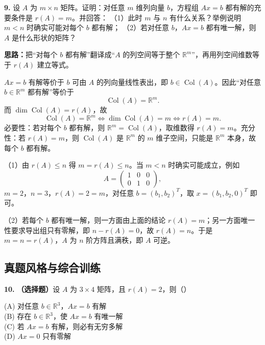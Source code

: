 \else \answerarea[10] \fi%

\textbf{9.} 设 $A$ 为 $m\times n$ 矩阵。证明：对任意 $m$ 维列向量 $b$，方程组 $Ax=b$ 都有解的充要条件是 $r(A)=m$。并回答：
（1）此时 $m$ 与 $n$ 有什么关系？举例说明 $m<n$ 时确实可能对每个 $b$ 都有解；
（2）若对任意 $b$，$Ax=b$ 都有唯一解，则 $A$ 是什么形状的矩阵？

\ifshowsolutions%

\textbf{思路：}把“对每个 $b$ 都有解”翻译成“$A$ 的列空间等于整个 $\mathbb R^m$”，再用列空间维数等于 $r(A)$ 建立等式。

$Ax=b$ 有解等价于 $b$ 可由 $A$ 的列向量线性表出，即 $b\in\operatorname{Col}(A)$。因此“对任意 $b\in\mathbb R^m$ 都有解”等价于
\[
\operatorname{Col}(A)=\mathbb R^m.
\]
而 $\dim\operatorname{Col}(A)=r(A)$，故
\[
\operatorname{Col}(A)=\mathbb R^m
\iff \dim\operatorname{Col}(A)=m
\iff r(A)=m.
\]
必要性：若对每个 $b$ 都有解，则 $\mathbb R^m=\operatorname{Col}(A)$，取维数得 $r(A)=m$。充分性：若 $r(A)=m$，则 $\operatorname{Col}(A)$ 是 $\mathbb R^m$ 的 $m$ 维子空间，只能是 $\mathbb R^m$ 本身，故每个 $b$ 都有解。

（1）由 $r(A)\le n$ 得 $m=r(A)\le n$。当 $m<n$ 时确实可能成立，例如
\[
A=\begin{pmatrix}1&0&0\\0&1&0\end{pmatrix},
\]
$m=2$，$n=3$，$r(A)=2=m$，对任意 $b=(b_1,b_2)^T$，取 $x=(b_1,b_2,0)^T$ 即可。

（2）若每个 $b$ 都有唯一解，则一方面由上面的结论 $r(A)=m$；另一方面唯一性要求导出组只有零解，即 $n-r(A)=0$，故 $r(A)=n$。于是 $m=n=r(A)$，$A$ 为 $n$ 阶方阵且满秩，即 $A$ 可逆。

\else \answerarea[10] \fi%

\subsection{真题风格与综合训练}

\textbf{10.} \textbf{（选择题）}设 $A$ 为 $3\times 4$ 矩阵，且 $r(A)=2$，则（\quad）
\begin{center}
(A) 对任意 $b\in\mathbb R^3$，$Ax=b$ 有解 \\[3pt]
(B) 存在 $b\in\mathbb R^3$，使 $Ax=b$ 有唯一解 \\[3pt]
(C) 若 $Ax=b$ 有解，则必有无穷多解 \\[3pt]
(D) $Ax=0$ 只有零解
\end{center}

